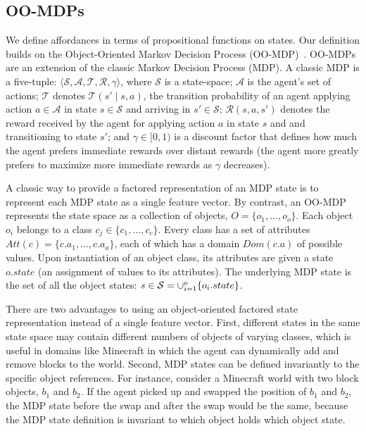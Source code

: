 \documentclass[conference]{IEEEtran}
\begin{document}
\subsection{OO-MDPs}
We define affordances in terms of propositional functions on states. Our definition builds on the Object-Oriented Markov Decision Process
(OO-MDP)~\citep{diuk08}.  OO-MDPs are an extension of
the classic Markov Decision Process (MDP).  A classic MDP is a
five-tuple: $\langle \mathcal{S}, \mathcal{A}, \mathcal{T},
\mathcal{R}, \gamma \rangle$, where $\mathcal{S}$ is a state-space;
$\mathcal{A}$ is the agent's set of actions; $\mathcal{T}$ denotes
$\mathcal{T}(s' \mid s,a)$, the transition probability of an agent
applying action $a \in \mathcal{A}$ in state $s \in \mathcal{S}$ and
arriving in $s' \in \mathcal{S}$; $\mathcal{R}(s,a,s')$ denotes the
reward received by the agent for applying action $a$ in state $s$ and
and transitioning to state $s'$; and $\gamma \in [0, 1)$ is a discount
  factor that defines how much the agent prefers immediate rewards
  over distant rewards (the agent more greatly prefers to maximize
  more immediate rewards as $\gamma$ decreases).

A classic way to provide a factored representation of an MDP state is to represent
each MDP state as a single feature vector. By contrast, an OO-MDP represents the state space as a collection of objects,
$O = \{o_1, \ldots, o_o \}$.  Each object $o_i$ belongs to a
class $c_j \in  \{c_1, \ldots, c_c\}$. Every class has a set of attributes
$Att(c) = \{c.a_1, \ldots, c.a_a \}$, each of which has a domain $Dom(c.a)$ of possible values.
Upon instantiation of an object class, its attributes are given a state $o.state$
(an assignment of values to its attributes).  The underlying MDP state is the set
of all the object states: $s \in {\cal S} = \cup_{i = 1}^o \{o_i.state\}$.

There are two advantages to using an object-oriented factored state
representation instead of a single feature vector. First, different
states in the same state space may contain different numbers of
objects of varying classes, which is useful in domains like Minecraft
in which the agent can dynamically add and remove blocks to the
world. Second, MDP states can be defined invariantly to the specific
object references.  For instance, consider a Minecraft world with two
block objects, $b_1$ and $b_2$.  If the agent picked up and swapped
the position of $b_1$ and $b_2$, the MDP state before the swap and
after the swap would be the same, because the MDP state definition is
invariant to which object holds which object state. 
\end{document}
